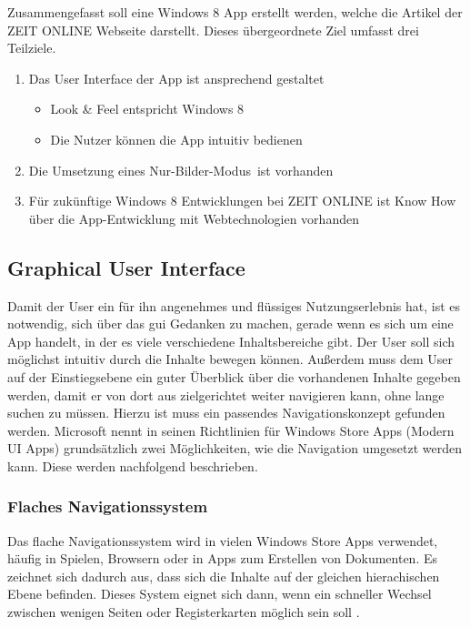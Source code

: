 \documentclass[12pt,a4paper,bibtotoc,abstracton]{scrartcl}
\begin{document}
Zusammengefasst soll eine Windows 8 App erstellt werden, welche die Artikel der ZEIT ONLINE Webseite darstellt. Dieses übergeordnete Ziel umfasst drei Teilziele.

\begin{enumerate}
	\item Das User Interface der App ist ansprechend gestaltet
	\begin{itemize}
		\item Look \& Feel entspricht Windows 8
		\item Die Nutzer können die App intuitiv bedienen
	\end{itemize}
	\item Die Umsetzung eines \glqq Nur-Bilder-Modus\grqq\ ist vorhanden
	\item Für zukünftige Windows 8 Entwicklungen bei ZEIT ONLINE ist Know How über die App-Entwicklung mit Webtechnologien vorhanden
\end{enumerate}


\subsection{Graphical User Interface}
\label{subsec:gui}
Damit der User ein für ihn angenehmes und flüssiges Nutzungserlebnis hat, ist es notwendig, sich über das \ac{gui} Gedanken zu machen, gerade wenn es sich um eine App handelt, in der es viele verschiedene Inhaltsbereiche gibt. Der User soll sich möglichst intuitiv durch die Inhalte bewegen können. Außerdem muss dem User auf der Einstiegsebene ein guter Überblick über die vorhandenen Inhalte gegeben werden, damit er von dort aus zielgerichtet weiter navigieren kann, ohne lange suchen zu müssen. Hierzu ist muss ein passendes Navigationskonzept gefunden werden.  Microsoft nennt in seinen Richtlinien für Windows Store Apps (Modern UI Apps) grundsätzlich zwei Möglichkeiten, wie die Navigation umgesetzt werden kann. Diese werden nachfolgend beschrieben.

\subsubsection{Flaches Navigationssystem}
\label{subsubsec:flachessystem}
Das flache Navigationssystem wird in vielen Windows Store Apps verwendet, häufig in Spielen, Browsern oder in Apps zum Erstellen von Dokumenten. Es zeichnet sich dadurch aus, dass sich die Inhalte auf der gleichen hierachischen Ebene befinden. Dieses System eignet sich dann, wenn ein schneller Wechsel zwischen wenigen Seiten oder Registerkarten möglich sein soll \citep{MicrosoftNavidesign2013}.
\end{document}

